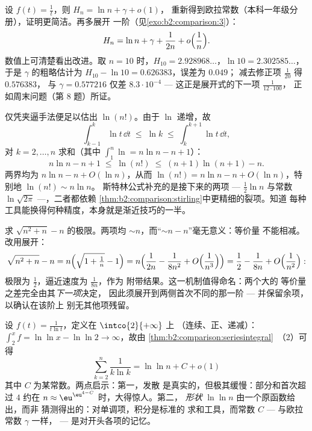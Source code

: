 \begin{example}[调和数的展开]\label{ex:b2:comparison:harmonic}
设 $f(t) = \frac1t$，则 $H_n = \ln n + \gamma + o(1)$，
重新得到欧拉常数（本科一年级分册），证明更简洁。再多展开
一阶（见\cref{exo:b2:comparison:3}）：
\[
H_n = \ln n + \gamma + \frac{1}{2n} + o\Bigl(\frac1n\Bigr).
\]
数值上可清楚看出改进。取 $n = 10$ 时，$H_{10} =
2.928968\dots$，$\ln 10 = 2.302585\dots$，于是
$\gamma$ 的粗略估计为 $H_{10} - \ln 10 = 0.626383$，误差为 $0.049$；
减去修正项 $\frac1{20}$ 得 $0.576383$，
与 $\gamma = 0.577216$ 仅差 $8.3\cdot10^{-4}$ ---
这正是展开式的下一项 $\frac{1}{12\cdot100}$，
正如周末问题（第 8 题）所证。
\end{example}

\begin{example}[不用斯特林公式的粗略 $\ln(n!)$]\label{ex:b2:comparison:lnfactorial}
仅凭夹逼手法便足以估出 $\ln(n!)$。由于
$\ln$ 递增，故
\[
\int_{k-1}^{k}\ln t\,\dd t \;\leq\; \ln k \;\leq\;
\int_{k}^{k+1}\ln t\,\dd t ,
\]
对 $k = 2, \dots, n$ 求和（其中 $\int_1^n\ln = n\ln n
- n + 1$）：
\[
n\ln n - n + 1 \;\leq\; \ln(n!) \;\leq\; (n+1)\ln(n+1) - n .
\]
两界均为 $n\ln n - n + O(\ln n)$，从而 $\ln(n!) = n\ln
n - n + O(\ln n)$，特别地 $\ln(n!) \sim n\ln n$。
斯特林公式补充的是接下来的两项 --- $\frac12\ln n$
与常数 $\ln\sqrt{2\pi}$ ---，二者都依赖
\cref{thm:b2:comparison:stirling}中更精细的裂项。知道
每种工具能换得何种精度，本身就是渐近技巧的一半。
\end{example}

\begin{example}[相消须借助展开]\label{ex:b2:comparison:cancellation}
求 $\sqrt{n^2 + n} - n$ 的极限。两项均
$\sim n$，而“$\sim n - n$”毫无意义：等价量
不能相减。改用展开：
\[
\sqrt{n^2 + n} - n
= n\Bigl(\sqrt{1 + \tfrac1n} - 1\Bigr)
= n\Bigl(\frac{1}{2n} - \frac{1}{8n^2} +
O\Bigl(\frac1{n^3}\Bigr)\Bigr)
= \frac12 - \frac{1}{8n} + O\Bigl(\frac1{n^2}\Bigr) :
\]
极限为 $\frac12$，逼近速度为 $\frac1{8n}$，作为
附带结果。这一机制值得命名：两个大的
等价量之差完全由其\emph{下一项}决定，
因此须展开到两侧首次不同的那一阶 ---
并保留余项，以确认在该阶上
别无其他项残留。
\end{example}

\begin{example}[发散比较的具体计算]\label{ex:b2:comparison:loglog}
设 $f(t) = \frac{1}{t\ln t}$，定义在 $\intco{2}{+\infty}$ 上
（连续、正、递减）：$\int_2^x f = \ln\ln x -
\ln\ln 2 \to \infty$，故由
\cref{thm:b2:comparison:seriesintegral}~（2）可得
\[
\sum_{k=2}^{n}\frac{1}{k\ln k} = \ln\ln n + C + o(1)
\]
其中 $C$ 为某常数。两点启示：第一，发散
是真实的，但极其缓慢：部分和首次超过 $4$ 约在 $n
\approx \eu^{\eu^{4 - C}}$ 时，大得惊人。第二，
\emph{形状} $\ln\ln n$ 由一个原函数给出，而非
猜测得出的：对单调项，积分是标准的
求和工具，而常数 $C$ --- 与欧拉常数 $\gamma$ 一样，
--- 是对开头各项的记忆。
\end{example}

